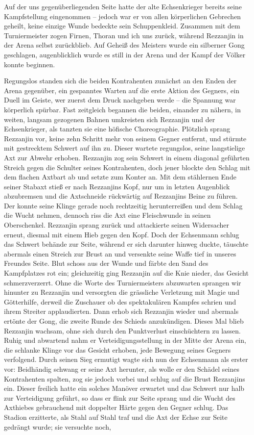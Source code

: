 Auf der uns gegenüberliegenden Seite hatte der alte Echsenkrieger bereits seine Kampfstellung eingenommen -- jedoch war er von allen körperlichen Gebrechen geheilt, keine einzige Wunde bedeckte sein Schuppenkleid. Zusammen mit dem Turniermeister zogen Firnen, Thoran und ich uns zurück, während Rezzanjin in der Arena selbst zurückblieb. Auf Geheiß des Meisters wurde ein silberner Gong geschlagen, augenblicklich wurde es still in der Arena und der Kampf der Völker konnte beginnen.

Regungslos standen sich die beiden Kontrahenten zunächst an den Enden der Arena gegenüber, ein gespanntes Warten auf die erste Aktion des Gegners, ein Duell im Geiste, wer zuerst dem Druck nachgeben werde -- die Spannung war körperlich spürbar. Fast zeitgleich begannen die beiden, einander zu nähern, in weiten, langsam gezogenen Bahnen umkreisten sich Rezzanjin und der Echsenkrieger, als tanzten sie eine höfische Choreographie. Plötzlich sprang Rezzanjin vor, keine zehn Schritt mehr von seinem Gegner entfernt, und stürmte mit gestrecktem Schwert auf ihn zu. Dieser wartete regungslos, seine langstielige Axt zur Abwehr erhoben. Rezzanjin zog sein Schwert in einem diagonal geführten Streich gegen die Schulter seines Kontrahenten, doch jener blockte den Schlag mit dem flachen Axtbart ab und setzte zum Konter an. Mit dem stählernen Ende seiner Stabaxt stieß er nach Rezzanjins Kopf, nur um in letzten Augenblick abzubremsen und die Axtschneide rückwärtig auf Rezzanjins Beine zu führen. Der konnte seine Klinge gerade noch rechtzeitig herunterreißen und dem Schlag die Wucht nehmen, dennoch riss die Axt eine Fleischwunde in seinen Oberschenkel. Rezzanjin sprang zurück und attackierte seinen Widersacher erneut, diesmal mit einem Hieb gegen den Kopf. Doch der Echsenmann schlug das Schwert behände zur Seite, während er sich darunter hinweg duckte, täuschte abermals einen Streich zur Brust an und versenkte seine Waffe tief in unseres Freundes Seite. Blut schoss aus der Wunde und färbte den Sand des Kampfplatzes rot ein; gleichzeitig ging Rezzanjin auf die Knie nieder, das Gesicht schmerzverzerrt. Ohne die Worte des Turniermeisters abzuwarten sprangen wir hinunter zu Rezzanjin und versorgten die grässliche Verletzung mit Magie und Götterhilfe, derweil die Zuschauer ob des spektakulären Kampfes schrien und ihrem Streiter applaudierten. Dann erhob sich Rezzanjin wieder und abermals ertönte der Gong, die zweite Runde des Schieds anzukündigen. Dieses Mal blieb Rezzanjin wachsam, ohne sich durch den Punktverlust einschüchtern zu lassen. Ruhig und abwartend nahm er Verteidigungsstellung in der Mitte der Arena ein, die schlanke Klinge vor das Gesicht erhoben, jede Bewegung seines Gegners verfolgend. Durch seinen Sieg ermutigt wagte sich nun der Echsenmann als erster vor: Beidhändig schwang er seine Axt herunter, als wolle er den Schädel seines Kontrahenten spalten, zog sie jedoch vorbei und schlug auf die Brust Rezzanjins ein. Dieser freilich hatte ein solches Manöver erwartet und das Schwert nur halb zur Verteidigung geführt, so dass er flink zur Seite sprang und die Wucht des Axthiebes gebrauchend mit doppelter Härte gegen den Gegner schlug. Das Stadion erzitterte, als Stahl auf Stahl traf und die Axt der Echse zur Seite gedrängt wurde; sie versuchte noch, 